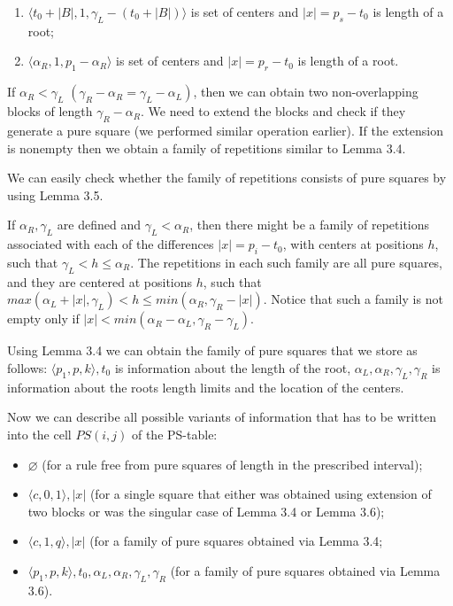 \documentclass[11pt]{article}
\begin{document}
\begin{enumerate}
\item
$\langle t_0 + |B|, 1, \gamma_L-(t_0 + |B|)\rangle$ is set of centers and $|x| = p_s - t_0$ is length of a root;
\item
$\langle \alpha_R, 1, p_1 - \alpha_R\rangle$ is set of centers and $|x| = p_r - t_0$ is length of a root.
\end{enumerate}

If $\alpha_R < \gamma_L$ $(\gamma_R - \alpha_R = \gamma_L - \alpha_L)$, then we can obtain two non-overlapping
blocks of length $\gamma_R - \alpha_R$. We need to extend the blocks and check if they generate a pure square (we
performed similar operation earlier). If the extension is nonempty then we obtain a family of repetitions similar
to Lemma 3.4.

We can easily check whether the family of repetitions consists of pure squares by using Lemma 3.5.

\begin{lem}[{\rm\cite{2}}]
If $\alpha_R, \gamma_L$ are defined and $\gamma_L < \alpha_R$, then there might be a family of repetitions
associated with each of the differences $|x| = p_i - t_0$, with centers at positions $h$, such that $\gamma_L < h
\leq \alpha_R$. The repetitions in each such family are all pure squares, and they are centered at positions $h$,
such that $max(\alpha_L + |x|, \gamma_L) < h \leq min(\alpha_R, \gamma_R-|x|)$. Notice that such a family is not
empty only if $|x| < min(\alpha_R-\alpha_L, \gamma_R-\gamma_L)$.
\end{lem}

Using Lemma 3.4 we can obtain the family of pure squares that we
store as follows: $\langle p_1, p, k\rangle, t_0$ is information
about the length of the root, $\alpha_L, \alpha_R, \gamma_L,
\gamma_R$ is information about the roots length limits and the
location of the centers.

Now we can describe all possible variants of information that has
to be written into the cell $PS(i,j)$ of the PS-table:

\begin{itemize}
\item
$\varnothing$ (for a rule free from pure squares of length in the prescribed interval);
\item
$\langle c, 0, 1\rangle, |x|$ (for a single square that either was obtained using extension of two blocks or was
the singular case of  Lemma 3.4 or Lemma 3.6);
\item
$\langle c, 1, q\rangle, |x|$ (for a family of pure squares obtained via Lemma 3.4;
\item
$\langle p_1, p, k\rangle, t_0, \alpha_L, \alpha_R, \gamma_L,
\gamma_R$ (for a family of pure squares obtained via Lemma 3.6).
\end{itemize}
\end{document}
